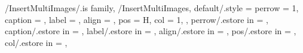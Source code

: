 \newcommand{\SetWidthOfImagePerRow}
{
  \ifthenelse{\equal{\GetMultiImagesPerRow}{1}}
  {
    \FPeval{\WidthOfImagePerRow}{1.0}
  } %
  {
    \provideboolean{WidthOfImagePerRowTmpIsDone}
    \setboolean{WidthOfImagePerRowTmpIsDone}{false}
    \FPeval{\TmpRemain}{
      clip((\GetMultiImageTotalValue) - (\GetMultiImageId))}
    \modulo{\GetMultiImageTotalValue}{\GetMultiImagesPerRow}
    \FPiflt{\TmpRemain}{\GetMultiImagesPerRow}
    \else
      \setboolean{WidthOfImagePerRowTmpIsDone}{true}
      \FPeval{
        \WidthOfImagePerRow}{
          clip(clip(1 / (\GetMultiImagesPerRow)))}
    \fi %
    \ifthenelse{\boolean{WidthOfImagePerRowTmpIsDone}}
    {}
    {
      \ifthenelse{\result = 0}
      {
        \FPeval{
          \WidthOfImagePerRow}{
            clip(clip(1 / (\GetMultiImagesPerRow)))}
      } %
      {
        \FPifeq{\TmpRemain}{0}
          \FPeval{\WidthOfImagePerRow}{1.0}
        \else
          \FPeval{
            \WidthOfImagePerRow}{
              clip(clip(1 / (\GetMultiImagesPerRow)))}
        \fi %
      } %
    } %
  } %
} %

\pgfkeys
{
  /InsertMultiImages/.is family, /InsertMultiImages,
  default/.style = 
  {
    perrow = 1,
    caption = \empty,
    label = \empty,
    align = \empty,
    pos = H,
    col = 1,
  },
  perrow/.estore in = \TmpMIValueImagePerRow,
  caption/.estore in = \TmpMIValueCaption,
  label/.estore in = \TmpMIValueLabel,
  align/.estore in = \TmpValueAlign,
  pos/.estore in = \TmpMIValuePosition,
  col/.estore in = \TmpMIValueColumn,
} %

